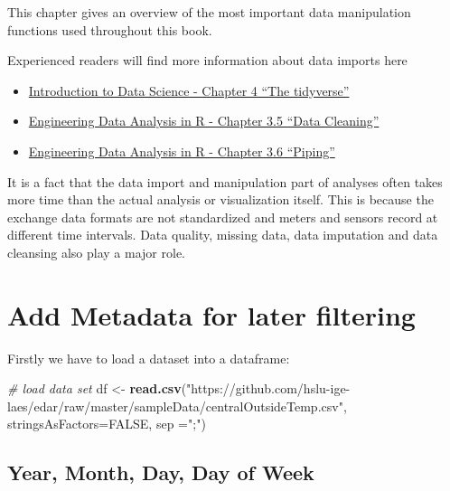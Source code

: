 \documentclass[
  a4paperpaper,
]{book}
\newenvironment{Shaded}{\begin{snugshade}}{\end{snugshade}}
\newcommand{\CommentTok}[1]{\textcolor[rgb]{0.56,0.35,0.01}{\textit{#1}}}
\newcommand{\DataTypeTok}[1]{\textcolor[rgb]{0.13,0.29,0.53}{#1}}
\newcommand{\KeywordTok}[1]{\textcolor[rgb]{0.13,0.29,0.53}{\textbf{#1}}}
\newcommand{\NormalTok}[1]{#1}
\newcommand{\OtherTok}[1]{\textcolor[rgb]{0.56,0.35,0.01}{#1}}
\newcommand{\StringTok}[1]{\textcolor[rgb]{0.31,0.60,0.02}{#1}}
\let\oldShaded\Shaded
\let\endoldShaded\endShaded
\renewenvironment{Shaded}{\footnotesize\oldShaded}{\endoldShaded}
\begin{document}
This chapter gives an overview of the most important data manipulation functions used throughout this book.

Experienced readers will find more information about data imports here

\begin{itemize}
\item
  \href{https://rafalab.github.io/dsbook/tidyverse.html\#summarizing-data}{Introduction to Data Science - Chapter 4 ``The tidyverse''}
\item
  \href{https://smogdr.github.io/edar_coursebook/rprog2.html\#data-cleaning}{Engineering Data Analysis in R - Chapter 3.5 ``Data Cleaning''}
\item
  \href{https://smogdr.github.io/edar_coursebook/rprog2.html\#piping}{Engineering Data Analysis in R - Chapter 3.6 ``Piping''}
\end{itemize}

It is a fact that the data import and manipulation part of analyses often takes more time than the actual analysis or visualization itself. This is because the exchange data formats are not standardized and meters and sensors record at different time intervals. Data quality, missing data, data imputation and data cleansing also play a major role.

\newpage

\hypertarget{add-metadata-for-later-filtering}{%
\section{Add Metadata for later filtering}\label{add-metadata-for-later-filtering}}

Firstly we have to load a dataset into a dataframe:

\begin{Shaded}
\begin{Highlighting}[]
\CommentTok{# load data set}
\NormalTok{df <-}\StringTok{ }\KeywordTok{read.csv}\NormalTok{(}\StringTok{"https://github.com/hslu-ige-laes/edar/raw/master/sampleData/centralOutsideTemp.csv"}\NormalTok{,}
               \DataTypeTok{stringsAsFactors=}\OtherTok{FALSE}\NormalTok{,}
               \DataTypeTok{sep =}\StringTok{";"}\NormalTok{)}
\end{Highlighting}
\end{Shaded}

\hypertarget{year-month-day-day-of-week}{%
\subsection{Year, Month, Day, Day of Week}\label{year-month-day-day-of-week}}
\end{document}
